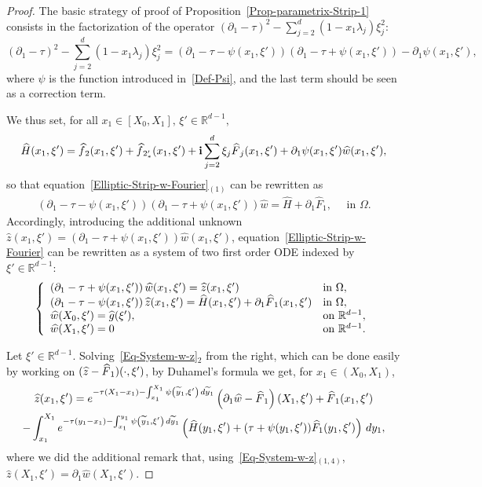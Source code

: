 \documentclass[10pt]{amsart}
\theoremstyle{definition}\newtheorem{defi}[theo]{Definition}\newtheorem{rema}[theo]{Remark}\newtheorem{exam}[theo]{Example}\newtheorem{exem}[theo]{Example}\newtheorem{nota}[theo]{Notation}
\newcommand*\R{\mathbb{R}}
\renewcommand{\i}{\mathbf{i}}
\renewcommand{\tilde}{\widetilde}
\renewcommand{\hat}{\widehat}
\let\oldtilde\tilde
\renewcommand*{\tilde}[1]{\mathchoice{\widetilde{#1}}{\widetilde{#1}}{\oldtilde{#1}}{\oldtilde{#1}}}
\let\oldhat\hat
\renewcommand*{\hat}[1]{\mathchoice{\widehat{#1}}{\widehat{#1}}{\oldhat{#1}}{\oldhat{#1}}}
\begin{document}
\begin{proof}
The basic strategy of proof of Proposition~\ref{Prop-parametrix-Strip-1} consists in the factorization of the operator $(\partial_1 - \tau)^2 - \sum_{j = 2}^d (1- x_1 \lambda_j) \xi_j^2$:
\[
(\partial_1 - \tau)^2 - \sum_{j = 2}^d (1- x_1 \lambda_j) \xi_j^2 =
\left(
\partial_1 - \tau- \psi(x_1, \xi')
\right)
\left(
\partial_1 - \tau + \psi(x_1, \xi')
\right) - \partial_1 \psi(x_1, \xi'),
\]
where $\psi$ is the function introduced in~\eqref{Def-Psi}, and the last term should be seen as a correction term.

We thus set, for all $ x_1 \in [X_0, X_1], \, \xi' \in \R^{d-1}, $
\[
\widehat H (x_1, \xi') = \hat f_2(x_1, \xi') + \hat f_{2_*'}(x_1, \xi') + \i \sum_{j=2}^d \xi_j \hat F_j(x_1, \xi') + \partial_1 \psi(x_1, \xi') \widehat w(x_1, \xi'),
\]
so that equation~\eqref{Elliptic-Strip-w-Fourier}$_{(1)}$ can be rewritten as
\begin{align*}
\left(
\partial_1 - \tau- \psi(x_1, \xi')
\right)
\left(
\partial_1 - \tau + \psi(x_1, \xi')
\right)
\widehat{w} =
\widehat{H} + \partial_1 \widehat F_1, \quad \text{ in } \Omega.
\end{align*}
Accordingly, introducing the additional unknown $\widehat{z}(x_1, \xi') \!\! =\!\!(\partial_1 - \tau + \psi(x_1, \xi')) \widehat w(x_1,\xi')$, equation~\eqref{Elliptic-Strip-w-Fourier} can be rewritten as a system of two first order ODE indexed by $\xi' \in \R^{d-1}$:
\begin{equation}\label{Eq-System-w-z}
\left\{
\begin{array}{ll}
\left(\partial_1-\tau+\psi(x_1,\xi') \right) \widehat{w}(x_1,\xi')=\widehat{z}(x_1,\xi') &\text{in } \Omega,
\\
\left(\partial_1-\tau-\psi(x_1,\xi') \right)\widehat{z}(x_1,\xi')=\widehat{H}(x_1,\xi') + \partial_1 \hat F_1(x_1, \xi') & \text{in } \Omega,
\\
\widehat{w}(X_0,\xi')= \widehat{g}(\xi'), &\text{on } \R^{d-1},
\\
\widehat{w}(X_1,\xi')= 0 &\text{on } \R^{d-1}.
\end{array}
\right.
\end{equation}

Let $\xi' \in \R^{d-1}$. Solving~\eqref{Eq-System-w-z}$_{2}$ from the right, which can be done easily by working on $(\widehat z - \hat F_1)(\cdot, \xi')$, by Duhamel’s formula we get, for $x_1 \in (X_0,X_1)$,
\begin{multline}\label{Explicit-z}
\widehat{z}(x_1, \xi') = e^{-\tau (X_1 -x_1)- \int_{x_1}^{X_1} \psi\left(\tilde{y}_1,\xi'\right) \, d \tilde{y}_1} \left(\partial_1 \widehat w- \hat F_1\right)(X_1, \xi') +
\hat F_1(x_1, \xi')
\\
-\int_{x_1}^{X_1} e^{-\tau (y_1-x_1)-\int_{x_1}^{y_1} \psi\left(\tilde{y}_1,\xi'\right) \, d \tilde{y}_1} \left(\widehat{H}(y_1, \xi') + (\tau + \psi(y_1, \xi')) \widehat F_1(y_1, \xi')\right) \, d y_1,
\end{multline}
where we did the additional remark that, using~\eqref{Eq-System-w-z}$_{(1,4)}$, $\widehat z(X_1, \xi') = \partial_1 \widehat w (X_1, \xi')$.


\end{proof}
\end{document}
